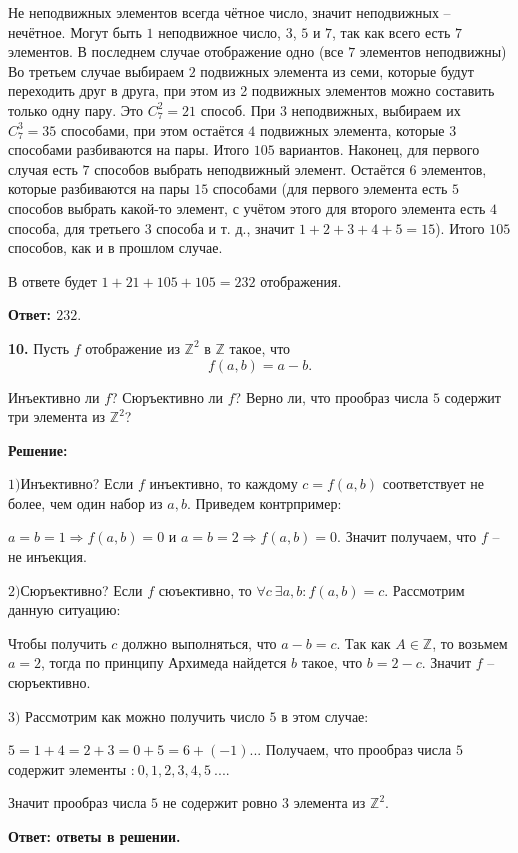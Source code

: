 \documentclass[a4paper,12pt]{article} %
\begin{document}
Не неподвижных элементов всегда чётное число, значит неподвижных -- нечётное. Могут быть $1$ неподвижное число, $3$, $5$ и $7$, так как всего есть $7$ элементов.
В последнем случае отображение одно (все $7$ элементов неподвижны) Во третьем случае выбираем $2$ подвижных элемента из семи, которые будут переходить друг в друга, при этом из 2 подвижных элементов можно составить только одну пару. Это $C_7^2=21$ способ. При $3$ неподвижных, выбираем их $C_7^3=35$ способами, при этом остаётся $4$ подвижных элемента, которые $3$ способами разбиваются на пары. Итого $105$ вариантов. Наконец, для первого случая есть $7$ способов выбрать неподвижный элемент. Остаётся $6$ элементов, которые разбиваются на пары $15$ способами (для первого элемента есть $5$ способов выбрать какой-то элемент, с учётом этого для второго элемента есть $4$ способа, для третьего $3$ способа и т. д., значит $1+2+3+4+5 = 15$). Итого $105$ способов, как и в прошлом случае.

В ответе будет $1+21+105+105=232$ отображения.

\begin{flushright}
\begin{large}
\textbf {Ответ: $232.$}
\end{large}
\end{flushright}

{\bf 10.} Пусть $f$ отображение из $\mathbb{Z}^2$ в $\mathbb{Z}$ такое, что \[f(a,b) = a - b.\]

Инъективно ли $f$? Сюръективно ли $f$? Верно ли, что прообраз числа $5$ содержит три элемента из $\mathbb{Z}^2$?
\begin{center}
\bfseries
{\Large Решение: }
\end{center}

$1)$Инъективно? Если $f$ инъективно, то  каждому $c = f(a,b)$ соответствует не более, чем один набор из $a,b$. Приведем контрпример:

$a = b = 1 \Rightarrow f(a,b) = 0$ и $a = b = 2 \Rightarrow f(a,b) = 0$. Значит получаем, что $f$ -- не инъекция.

$2)$Сюръективно? Если $f$ сюъективно, то $\forall c \ \exists a,b : f(a,b) = c$. Рассмотрим данную ситуацию:

Чтобы получить $c$ должно выполняться, что $a - b = c$. Так как $A \in \mathbb{Z}$, то возьмем $a = 2$, тогда по принципу Архимеда найдется $b$ такое, что $b = 2 - c$. Значит $f$ -- сюръективно.

$3)$ Рассмотрим как можно получить число $5$ в этом случае:

$5 = 1+4=2+3=0+5=6+(-1) ..$. Получаем, что прообраз числа $5$ содержит элементы :$\ 0,1,2,3,4,5\ ...$.

Значит прообраз числа $5$ не содержит ровно 3 элемента из $\mathbb{Z}^2$.


\begin{flushright}
\begin{large}
\textbf {Ответ: ответы в решении.}
\end{large}
\end{flushright}
\end{document}
